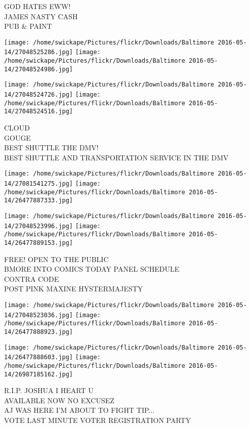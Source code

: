 \documentclass[10pt,letterpaper]{article}
\begin{document}
GOD HATES EWW!\\
JAMES NASTY CASH\\
PUB \& PAINT\\
\pagebreak

\texttt{[image: /home/swickape/Pictures/flickr/Downloads/Baltimore 2016-05-14/27048525286.jpg]}
\texttt{[image: /home/swickape/Pictures/flickr/Downloads/Baltimore 2016-05-14/27048524986.jpg]}

\texttt{[image: /home/swickape/Pictures/flickr/Downloads/Baltimore 2016-05-14/27048524726.jpg]}
\texttt{[image: /home/swickape/Pictures/flickr/Downloads/Baltimore 2016-05-14/27048524516.jpg]}

CLOUD\\
GOUGE\\
BEST SHUTTLE THE DMV!\\
BEST SHUTTLE AND TRANSPORTATION SERVICE IN THE DMV\\
\pagebreak

\texttt{[image: /home/swickape/Pictures/flickr/Downloads/Baltimore 2016-05-14/27081541275.jpg]}
\texttt{[image: /home/swickape/Pictures/flickr/Downloads/Baltimore 2016-05-14/26477887333.jpg]}

\texttt{[image: /home/swickape/Pictures/flickr/Downloads/Baltimore 2016-05-14/27048523996.jpg]}
\texttt{[image: /home/swickape/Pictures/flickr/Downloads/Baltimore 2016-05-14/26477889153.jpg]}

FREE!  OPEN TO THE PUBLIC\\
BMORE INTO COMICS TODAY PANEL SCHEDULE\\
CONTRA CODE\\
POST PINK MAXINE HYSTERMAJESTY\\
\pagebreak

\texttt{[image: /home/swickape/Pictures/flickr/Downloads/Baltimore 2016-05-14/27048523036.jpg]}
\texttt{[image: /home/swickape/Pictures/flickr/Downloads/Baltimore 2016-05-14/26477888923.jpg]}

\texttt{[image: /home/swickape/Pictures/flickr/Downloads/Baltimore 2016-05-14/26477888603.jpg]}
\texttt{[image: /home/swickape/Pictures/flickr/Downloads/Baltimore 2016-05-14/26987185162.jpg]}

R.I.P. JOSHUA I HEART U\\
AVAILABLE NOW NO EXCUSEZ\\
AJ WAS HERE I'M ABOUT TO FIGHT TIP...\\
VOTE LAST MINUTE VOTER REGISTRATION PARTY\\
\pagebreak
\end{document}
